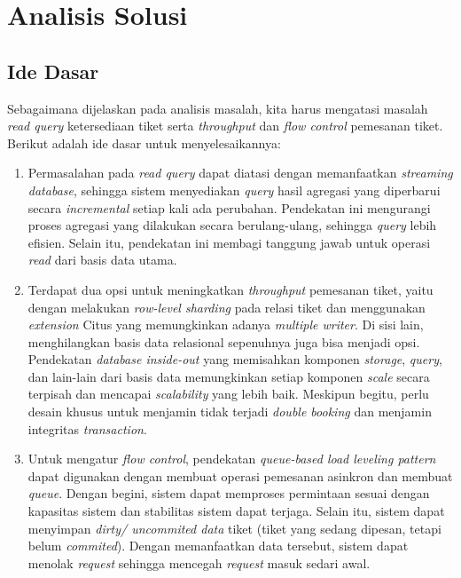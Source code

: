 \section{Analisis Solusi}

\subsection{Ide Dasar}

Sebagaimana dijelaskan pada analisis masalah, kita harus mengatasi masalah \textit{read query} ketersediaan tiket serta \textit{throughput} dan \textit{flow control} pemesanan tiket. Berikut adalah ide dasar untuk menyelesaikannya:

\begin{enumerate}
  \item Permasalahan pada \textit{read query} dapat diatasi dengan memanfaatkan \textit{streaming database}, sehingga sistem menyediakan \textit{query} hasil agregasi yang diperbarui secara \textit{incremental} setiap kali ada perubahan. Pendekatan ini mengurangi proses agregasi yang dilakukan secara berulang-ulang, sehingga \textit{query} lebih efisien. Selain itu, pendekatan ini membagi tanggung jawab untuk operasi \textit{read} dari basis data utama.
  \item Terdapat dua opsi untuk meningkatkan \textit{throughput} pemesanan tiket, yaitu dengan melakukan \textit{row-level sharding} pada relasi tiket dan menggunakan \textit{extension} Citus yang memungkinkan adanya \textit{multiple writer}. Di sisi lain, menghilangkan basis data relasional sepenuhnya juga bisa menjadi opsi. Pendekatan \textit{database inside-out} yang memisahkan komponen \textit{storage}, \textit{query}, dan lain-lain dari basis data memungkinkan setiap komponen \textit{scale} secara terpisah dan mencapai \textit{scalability} yang lebih baik. Meskipun begitu, perlu desain khusus untuk menjamin tidak terjadi \textit{double booking} dan menjamin integritas \textit{transaction}.
  \item Untuk mengatur \textit{flow control}, pendekatan \textit{queue-based load leveling pattern} dapat digunakan dengan membuat operasi pemesanan asinkron dan membuat \textit{queue}. Dengan begini, sistem dapat memproses permintaan sesuai dengan kapasitas sistem dan stabilitas sistem dapat terjaga. Selain itu, sistem dapat menyimpan \textit{dirty/ uncommited data} tiket (tiket yang sedang dipesan, tetapi belum \textit{commited}). Dengan memanfaatkan data tersebut, sistem dapat menolak \textit{request} sehingga mencegah \textit{request} masuk sedari awal. 
\end{enumerate}

